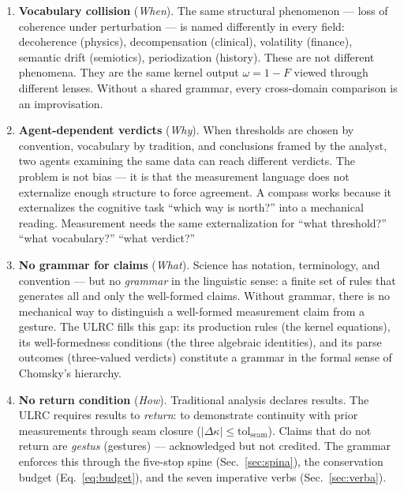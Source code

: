 \documentclass[
  aps,
  prd,
  twocolumn,
  superscriptaddress,
  nofootinbib,
  floatfix
]{revtex4-2}
\newcommand{\tolseam}{\mathrm{tol}_{\mathrm{seam}}}
\newcommand{\Fid}{F}
\newcommand{\Drft}{\omega}
\newcommand{\Logint}{\kappa}
\newcommand{\lat}[1]{\textit{#1}}
\begin{document}
\begin{enumerate}[nosep,leftmargin=*]
\item \textbf{Vocabulary collision} (\lat{When}).
  The same structural phenomenon --- loss of coherence under
  perturbation --- is named differently in every field:
  decoherence (physics), decompensation (clinical),
  volatility (finance), semantic drift (semiotics),
  periodization (history). These are not different phenomena.
  They are the same kernel output $\Drft = 1 - \Fid$ viewed
  through different lenses. Without a shared grammar, every
  cross-domain comparison is an improvisation.

\item \textbf{Agent-dependent verdicts} (\lat{Why}).
  When thresholds are chosen by convention, vocabulary by
  tradition, and conclusions framed by the analyst, two agents
  examining the same data can reach different verdicts. The
  problem is not bias --- it is that the measurement language
  does not externalize enough structure to force agreement.
  A compass works because it externalizes the cognitive task
  ``which way is north?'' into a mechanical reading. Measurement
  needs the same externalization for ``what threshold?''
  ``what vocabulary?'' ``what verdict?''

\item \textbf{No grammar for claims} (\lat{What}).
  Science has notation, terminology, and convention --- but no
  \emph{grammar} in the linguistic sense: a finite set of rules
  that generates all and only the well-formed claims. Without
  grammar, there is no mechanical way to distinguish a
  well-formed measurement claim from a gesture. The ULRC fills
  this gap: its production rules (the kernel equations), its
  well-formedness conditions (the three algebraic identities),
  and its parse outcomes (three-valued verdicts) constitute a
  grammar in the formal sense of Chomsky's hierarchy.

\item \textbf{No return condition} (\lat{How}).
  Traditional analysis declares results. The ULRC requires
  results to \emph{return}: to demonstrate continuity with prior
  measurements through seam closure ($|\Delta\Logint| \leq
  \tolseam$). Claims that do not return are \lat{gestus}
  (gestures) --- acknowledged but not credited. The grammar
  enforces this through the five-stop spine
  (Sec.~\ref{sec:spina}), the conservation budget
  (Eq.~\ref{eq:budget}), and the seven imperative verbs
  (Sec.~\ref{sec:verba}).
\end{enumerate}
\end{document}
